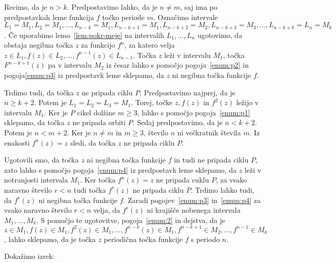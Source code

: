 \documentclass[../TG_magistrsko_delo_sections.tex]{subfiles}
\begin{document}
\begin{dokaz}
Recimo, da je $n>k$. Predpostavimo lahko, da je $n \neq m$, saj ima po predpostavkah leme funkcija $f$ točko periode $m$. Označimo intervale $L_1 = M_1, L_2 = M_1, \dots, L_{n-k} = M_1, L_{n-k+1} = M_1, L_{n-k+2} = M_2,  L_{n-k+3} = M_3, \dots, L_{n-k+k} =L_n =M_k$. Če uporabimo lemo~\ref{lem:pokr-meje} na intervalih $L_1, \dots, L_n$ ugotovimo, da obstaja negibna točka $z$ za funkcijo $f^n$, za katero velja $z \in L_1, f(z) \in L_2, \dots, f^{n-1}(z) \in L_{n-1}$. Točka $z$ leži v intervalu $M_1$, točka $F^{n-k+1}(z)$ pa v intervalu $M_2$ iz česar lahko s pomočjo pogoja~\ref{enum:p2} in pogoja\ref{enum:p3} iz predpostavk leme sklepamo, da $z$ ni negibna točka funkcije $f$. 

Trdimo tudi, da točka $z$ ne pripada ciklu $P$. Predpostavimo najprej, da je $n \geq k + 2$. Potem je $L_1 =L_2 = L_3 = M_1$. Torej, točke $z, f(z)$ in $f^2(z)$ ležijo v intervalu $M_1$. Ker je $P$ cikel dolžine $m \geq 3$, lahko s pomočjo pogoja~\ref{enum:p1} sklepamo, da točka $z$ ne pripada orbiti $P$. Sedaj predpostavimo, da je $n < k+2$. Potem je $n < m+2$. Ker je $n\neq m$ in $m \geq 3$, število $n$ ni večkratnik števila $m$. Iz enakosti $f^n(z) = z$ sledi, da točka $z$ ne pripada ciklu $P$.

Ugotovili smo, da točka $z$ ni negibna točka funkcije $f$ in tudi ne pripada ciklu $P$, zato lahko s pomočjo pogoja~\ref{enum:p4} iz predpostavk leme sklepamo, da $z$ leži v notranjosti intervala $M_1$. Ker točka $f^n(z) = z$ ne pripada cuklu $P$, za vsako naravno število $r < n$ tudi točka $f^r(z)$ ne pripada ciklu $P$. Trdimo lahko tudi, da $f^r(z)$ ni negibna točka funkcije $f$. Zaradi pogojev~\ref{enum:p3} in~\ref{enum:p4} za vsako naravno število $r < n$ velja, da $f^r(z)$ ni krajišče nobenega intervala $M_1, \dots, M_k$. S pomočjo te ugotovitve, pogoja~\ref{enum:2} in dejstva, da je $z \in M_1, f(z) \in M_1, f^2(z) \in M_1, \dots, f^{n-k}(z) \in M_1, f^{n-k+1} \in M_2, \dots, f^{n-1} \in M_k$, lahko sklepamo, da je točka $z$ periodična točka funkcije $f$ s periodo $n$.
\end{dokaz}


Dokažimo izrek:
\end{document}
